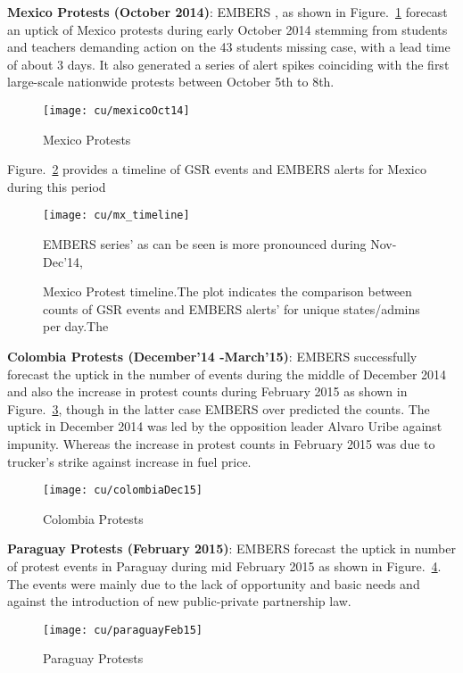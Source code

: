 \textbf{Mexico Protests (October 2014)}:
EMBERS , as shown in Figure.~\ref{fig:mexicoOct14} forecast an uptick of Mexico
protests during early October 2014 stemming from students and teachers demanding
action on the 43 students missing case, with a lead time of about 3
days. It also generated  a series of alert spikes coinciding with the first
large-scale nationwide protests between October 5th to 8th.

\begin{figure}[H]
\centering
\texttt{[image: cu/mexicoOct14]}
\caption{Mexico Protests}
\label{fig:mexicoOct14}
\end{figure}

Figure.~\ref{fig:mexicoTimeline} provides a timeline of GSR events and
EMBERS alerts for Mexico during this period
\begin{figure}[H]
\centering
\texttt{[image: cu/mx\_timeline]}
\caption{Mexico Protest timeline.The plot indicates the comparison between counts of GSR events
and EMBERS alerts’ for unique states/admins per day.The  }
EMBERS series’ as can be seen is more pronounced during Nov-Dec’14,
\label{fig:mexicoTimeline}
\end{figure}

\textbf{Colombia Protests (December'14 -March'15)}:
EMBERS successfully forecast the uptick in the number of events during the
middle of December 2014 and also the increase in protest counts during February
2015 as shown in Figure.~\ref{fig:colombiaDec14}, though in the latter case EMBERS over predicted the counts. The uptick in
December 2014 was led by the opposition leader Alvaro Uribe against impunity.
Whereas the increase in  protest counts in February 2015
was due to trucker’s strike against increase in fuel price.

\begin{figure}[H]
\centering
\texttt{[image: cu/colombiaDec15]}
\caption{Colombia Protests}
\label{fig:colombiaDec14}
\end{figure}

\textbf{Paraguay Protests (February 2015)}:
EMBERS forecast the uptick in number of protest events in Paraguay during mid
February 2015 as shown in Figure.~\ref{fig:paraguay15}. The events were mainly due to the lack of opportunity and basic
needs and against the introduction of new public-private partnership law.

\begin{figure}[H]
\centering
\texttt{[image: cu/paraguayFeb15]}
\caption{Paraguay Protests}
\label{fig:paraguay15}
\end{figure}


